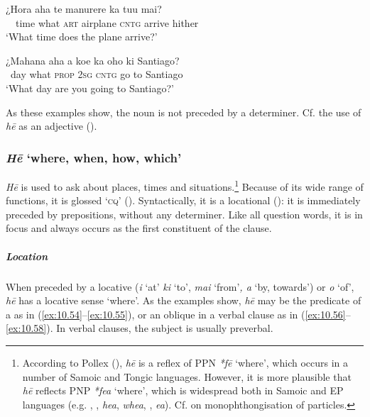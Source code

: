 \ea\label{ex:10.52}
\gll ¿Hora aha te manurere ka tu{\ꞌ}u mai? \\
~~time what \textsc{art} airplane \textsc{cntg} arrive hither \\

\glt 
‘What time does the plane arrive?’ \textstyleExampleref{[R208.214]} 
\z

\ea\label{ex:10.53}
\gll ¿Mahana aha a koe ka oho ki Santiago? \\
~day what \textsc{prop} \textsc{2sg} \textsc{cntg} go to Santiago \\

\glt
‘What day are you going to Santiago?’ \textstyleExampleref{[R208.226]} 
\z

As these examples show, the noun is not preceded by a determiner. Cf. the use of \textit{hē} as an adjective (). 

\subsubsection{\textit{Hē} ‘where, when, how, which’}\label{sec:10.3.2.3}
\textit{Hē} is used to ask about places, times and situations.\footnote{\label{fn:490}According to Pollex (\citealt{GreenhillClark2011}), \textit{hē} is a reflex of PPN \textit{*fē} ‘where’, which occurs in a number of Samoic and Tongic languages. However, it is more plausible that \textit{hē} reflects PNP \textit{*fea} ‘where’, which is widespread both in Samoic and EP languages (e.g. , ,  \textit{hea},  \textit{whea}, ,  \textit{{\ꞌ}ea}). Cf.  on monophthongisation of particles.} Because of its wide range of functions, it is glossed ‘\textsc{cq}’ (). Syntactically, it is a locational (): it is immediately preceded by prepositions, without any determiner. Like all question words, it is in focus and always occurs as the first constituent of the clause.

\subparagraph{Location} When preceded by a locative  (\textit{{\ꞌ}i} ‘at’ \textit{ki} ‘to’, \textit{mai} ‘from’\textit{, a} ‘by, towards’) or \textit{o} ‘of’, \textit{hē} has a locative sense ‘where’. As the examples show, \textit{hē} may be the predicate of a  as in (\ref{ex:10.54}–\ref{ex:10.55}), or an oblique in a verbal clause as in (\ref{ex:10.56}–\ref{ex:10.58}). In verbal clauses, the subject is usually preverbal.

